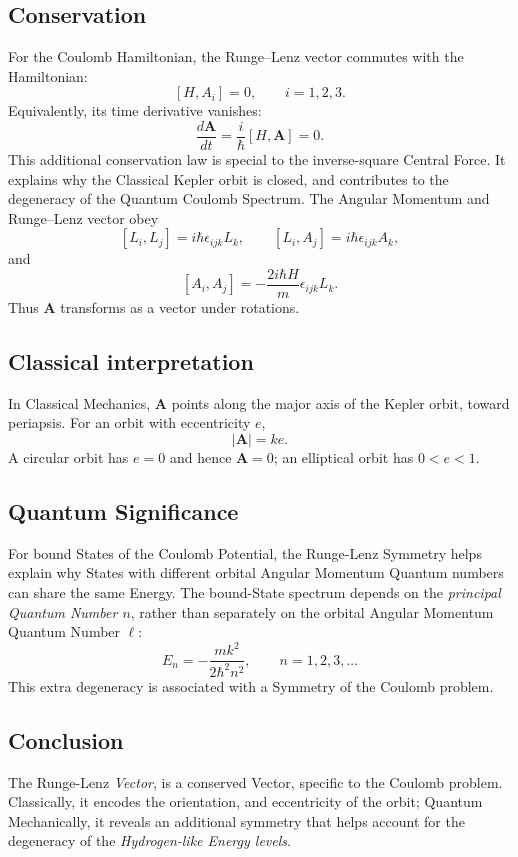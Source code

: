 \documentclass[a4paper, 10pt, onepage]{elegantbook}
\begin{document}
{\subsection{Conservation}

For the Coulomb Hamiltonian, the Runge--Lenz vector commutes with the
Hamiltonian:
\[
[H,A_i]=0,\qquad i=1,2,3.
\]
Equivalently, its time derivative vanishes:
\[
\frac{d\mathbf{A}}{dt}
=\frac{i}{\hbar}[H,\mathbf{A}]=0.
\]
This additional conservation law is special to the inverse-square Central Force. It explains why the Classical Kepler 
orbit is closed, and contributes to the degeneracy of the Quantum Coulomb Spectrum. The Angular Momentum and 
Runge--Lenz vector obey
\[
[L_i,L_j]=i\hbar\epsilon_{ijk}L_k,
\qquad
[L_i,A_j]=i\hbar\epsilon_{ijk}A_k,
\]
and
\[
[A_i,A_j]=-\frac{2i\hbar H}{m}\epsilon_{ijk}L_k.
\]
Thus \(\mathbf{A}\) transforms as a vector under rotations.

\subsection{Classical interpretation}

In Classical Mechanics, \(\mathbf{A}\) points along the major axis of the Kepler orbit, toward periapsis. For an orbit 
with eccentricity
\(e\),
\[
|\mathbf{A}|=ke.
\]
A circular orbit has \(e=0\) and hence \(\mathbf{A}=0\); an elliptical orbit has \(0<e<1\).

\subsection{Quantum Significance}

For bound States of the Coulomb Potential, the Runge-Lenz Symmetry helps explain why States with different orbital 
Angular Momentum
Quantum numbers can share the same Energy. The bound-State spectrum depends on the \emph{principal Quantum Number 
\(n\)}, rather than separately on the orbital Angular Momentum Quantum Number \(\ell\):
\[
E_n=-\frac{m k^2}{2\hbar^2 n^2},
\qquad n=1,2,3,\ldots
\]
This extra degeneracy is associated with a Symmetry of the Coulomb problem.

\subsection{Conclusion}

The Runge-Lenz \emph{Vector}, is a conserved Vector, specific to the Coulomb problem. Classically, it encodes the 
orientation, and eccentricity of the orbit; Quantum Mechanically, it reveals an additional symmetry that helps account 
for the degeneracy of the \emph{Hydrogen-like Energy levels}.


}
\end{document}
